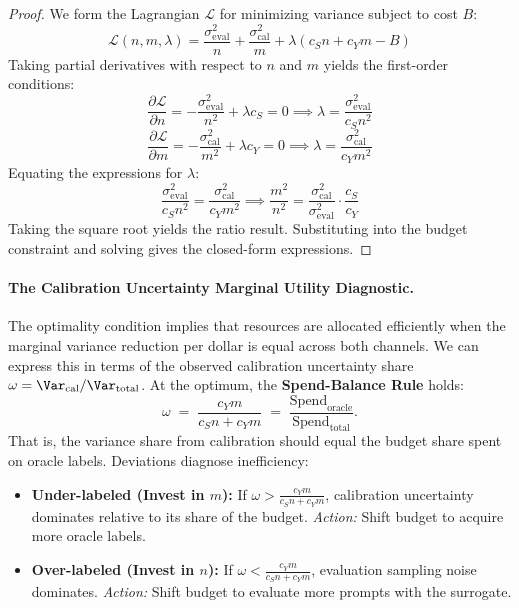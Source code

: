 \begin{proof}
We form the Lagrangian $\mathcal{L}$ for minimizing variance subject to cost $B$:
\[
\mathcal{L}(n, m, \lambda) = \frac{\sigma^2_{\mathrm{eval}}}{n} + \frac{\sigma^2_{\mathrm{cal}}}{m} + \lambda(c_S n + c_Y m - B)
\]
Taking partial derivatives with respect to $n$ and $m$ yields the first-order conditions:
\[
\frac{\partial \mathcal{L}}{\partial n} = -\frac{\sigma^2_{\mathrm{eval}}}{n^2} + \lambda c_S = 0 \implies \lambda = \frac{\sigma^2_{\mathrm{eval}}}{c_S n^2}
\]
\[
\frac{\partial \mathcal{L}}{\partial m} = -\frac{\sigma^2_{\mathrm{cal}}}{m^2} + \lambda c_Y = 0 \implies \lambda = \frac{\sigma^2_{\mathrm{cal}}}{c_Y m^2}
\]
Equating the expressions for $\lambda$:
\[
\frac{\sigma^2_{\mathrm{eval}}}{c_S n^2} = \frac{\sigma^2_{\mathrm{cal}}}{c_Y m^2} \implies \frac{m^2}{n^2} = \frac{\sigma^2_{\mathrm{cal}}}{\sigma^2_{\mathrm{eval}}} \cdot \frac{c_S}{c_Y}
\]
Taking the square root yields the ratio result. Substituting into the budget constraint and solving gives the closed-form expressions.
\end{proof}

\paragraph{The Calibration Uncertainty Marginal Utility Diagnostic.}
The optimality condition implies that resources are allocated efficiently when the marginal variance reduction per dollar is equal across both channels. We can express this in terms of the observed calibration uncertainty share $\omega = \Var_{\mathrm{cal}}/\Var_{\mathrm{total}}$. At the optimum, the \textbf{Spend-Balance Rule} holds:
\[
\omega \;=\; \frac{c_Y m}{c_S n + c_Y m} \;=\; \frac{\text{Spend}_{\mathrm{oracle}}}{\text{Spend}_{\mathrm{total}}}.
\]
That is, the variance share from calibration should equal the budget share spent on oracle labels. Deviations diagnose inefficiency:

\begin{itemize}[leftmargin=*,nosep]
\item \textbf{Under-labeled (Invest in $m$):} If $\omega > \frac{c_Y m}{c_S n + c_Y m}$, calibration uncertainty dominates relative to its share of the budget. \emph{Action:} Shift budget to acquire more oracle labels.
\item \textbf{Over-labeled (Invest in $n$):} If $\omega < \frac{c_Y m}{c_S n + c_Y m}$, evaluation sampling noise dominates. \emph{Action:} Shift budget to evaluate more prompts with the surrogate.
\end{itemize}

